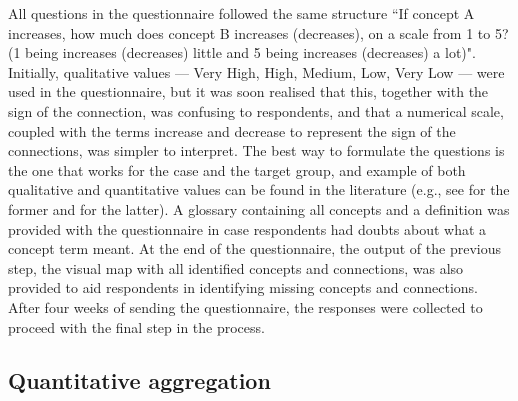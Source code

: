 All questions in the questionnaire followed the same structure ``If concept A increases, how much does concept B increases (decreases), on a scale from 1 to 5? (1 being increases (decreases) little and 5 being increases (decreases) a lot)". Initially, qualitative values --- Very High, High, Medium, Low, Very Low --- were used in the questionnaire, but it was soon realised that this, together with the sign of the connection, was confusing to respondents, and that a numerical scale, coupled with the terms increase and decrease to represent the sign of the connections, was simpler to interpret. The best way to formulate the questions is the one that works for the case and the target group, and example of both qualitative and quantitative values can be found in the literature (e.g., see \cite{morone2021using} for the former and \cite{olazabal2016use} for the latter). A glossary containing all concepts and a definition was provided with the questionnaire in case respondents had doubts about what a concept term meant. At the end of the questionnaire, the output of the previous step, the visual map with all identified concepts and connections, was also provided to aid respondents in identifying missing concepts and connections. After four weeks of sending the questionnaire, the responses were collected to proceed with the final step in the process. 

\subsection{Quantitative aggregation}

